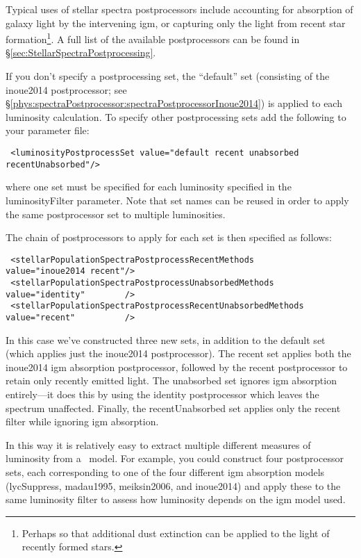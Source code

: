 Typical uses of stellar spectra postprocessors include accounting for absorption of galaxy light by the intervening \gls{igm}, or capturing only the light from recent star formation\footnote{Perhaps so that additional dust extinction can be applied to the light of recently formed stars.}. A full list of the available postprocessors can be found in \S\ref{sec:StellarSpectraPostprocessing}.

If you don't specify a postprocessing set, the ``default'' set (consisting of the {\normalfont \ttfamily inoue2014} postprocessor; see \S\ref{phys:spectraPostprocessor:spectraPostprocessorInoue2014}) is applied to each luminosity calculation. To specify other postprocessing sets add the following to your parameter file:
\begin{verbatim}
 <luminosityPostprocessSet value="default recent unabsorbed recentUnabsorbed"/>
\end{verbatim}
where one set must be specified for each luminosity specified in the {\normalfont \ttfamily luminosityFilter} parameter. Note that set names can be reused in order to apply the same postprocessor set to multiple luminosities.

The chain of postprocessors to apply for each set is then specified as follows:
\begin{verbatim}
 <stellarPopulationSpectraPostprocessRecentMethods           value="inoue2014 recent"/>
 <stellarPopulationSpectraPostprocessUnabsorbedMethods       value="identity"        />
 <stellarPopulationSpectraPostprocessRecentUnabsorbedMethods value="recent"          />
\end{verbatim}
In this case we've constructed three new sets, in addition to the default set (which applies just the {\normalfont \ttfamily inoue2014} postprocessor). The {\normalfont \ttfamily recent} set applies both the {\normalfont \ttfamily inoue2014} \gls{igm} absorption postprocessor, followed by the {\normalfont \ttfamily recent} postprocessor to retain only recently emitted light. The {\normalfont \ttfamily unabsorbed} set ignores \gls{igm} absorption entirely---it does this by using the {\normalfont \ttfamily identity} postprocessor which leaves the spectrum unaffected. Finally, the {\normalfont \ttfamily recentUnabsorbed} set applies only the {\normalfont \ttfamily recent} filter while ignoring \gls{igm} absorption.

In this way it is relatively easy to extract multiple different measures of luminosity from a \glc\ model. For example, you could construct four postprocessor sets, each corresponding to one of the four different \gls{igm} absorption models ({\normalfont \ttfamily lycSuppress}, {\normalfont \ttfamily madau1995}, {\normalfont \ttfamily meiksin2006}, and {\normalfont \ttfamily inoue2014}) and apply these to the same luminosity filter to assess how luminosity depends on the \gls{igm} model used.

